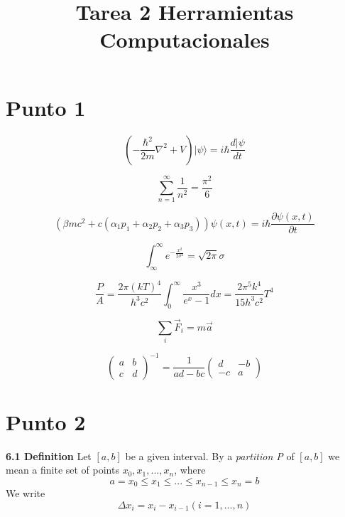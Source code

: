 \documentclass{article}
\title{Tarea 2 Herramientas Computacionales}
\begin{document}
\maketitle



\section*{Punto 1}
\begin{equation}
\left(-\frac{\hbar^{2}}{2m} {\nabla^{2}}+V\right)|\psi\rangle= i\hbar\frac{d|\psi}{dt}
\end{equation}

\begin{equation}
\sum_{n=1}^{\infty}{\frac{1}{n^{2}}}=\frac{\pi^{2}}{6}
\end{equation}

\begin{equation}
\left(\beta m c^{2} +c\left(\alpha_{1} p_{1} + \alpha_{2} p_{2} + \alpha_{3} p_{3}  \right) \right)\psi \left(x,t\right) =  i\hbar\frac{\partial \psi \left(x,t\right)}{\partial t}
\end{equation}


\begin{equation}
\int^{\infty}_{\infty} e^{-\frac{x^{2}}{2 \sigma^{2}}}=\sqrt{2 \pi} \sigma
\end{equation}

\begin{equation}
\frac{P}{A}=\frac{2\pi \left(kT \right)^{4}}{h^{3}c^{2}}\int_{0}^{\infty}\frac{x^{3}}{e^{x}-1}dx=\frac{2 \pi^{5} k^{4}}{15 h^{3}c^{2}}T^{4}
\end{equation}

\begin{equation}
\sum_{i}\vec{F}_{i}=m \vec{a}
\end{equation}


\begin{equation}
\left(
\begin{array}{cc}
a & b \\
c & d
\end{array}
\right)^{-1}
=\frac{1}{ad-bc}
\left(
\begin{array}{cc}
d & -b \\
-c & a
\end{array}
\right)
\end{equation}


\section*{Punto 2}
\textbf{6.1 Definition} Let $[a,b]$ be a given interval. By a \textit{partition P} of $[a,b]$ we mean a finite set of points $x_{0},x_{1},...,x_{n}$, where
\begin{equation}
a=x_{0}\leq x_{1} \leq ... \leq x_{n-1} \leq x_{n}=b
\end{equation}
We write
\begin{equation}
\Delta x_{i}=x_{i}- x_{i-1} \left(i=1,...,n\right)
\end{equation}
\end{document}
